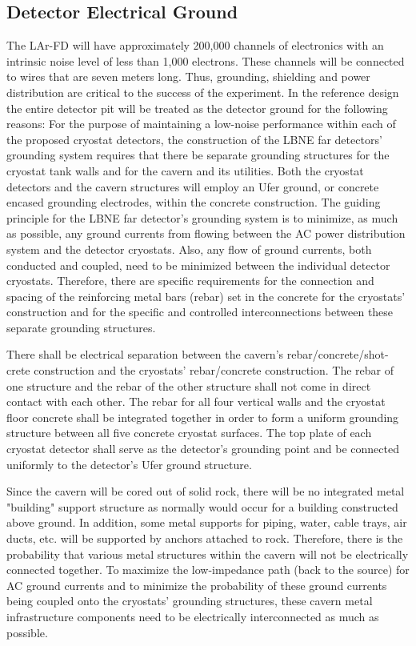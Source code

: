 \subsection{Detector Electrical Ground} 
\label{fd:install:integ:elecgnd}

The LAr-FD will have approximately 200,000 channels of electronics with an intrinsic noise level of less than 1,000 electrons. These channels will be connected to wires that are seven meters long. Thus, 
grounding, shielding and power distribution are critical to the success of the experiment. In the reference design the entire detector pit will be treated as the detector ground for the following reasons: 
For the purpose of maintaining a low-noise performance within each of the proposed cryostat detectors, the construction of the LBNE far detectors' grounding system requires that there be separate grounding 
structures for the cryostat tank walls and for the cavern and its utilities. Both the cryostat detectors and the cavern structures will employ an Ufer ground, or concrete encased grounding electrodes, within the concrete construction. The guiding principle for the LBNE far detector's grounding system is to minimize, 
as much as possible, any ground currents from flowing between the AC power distribution system and the detector cryostats. Also, any flow of ground currents, both conducted and coupled, need to be 
minimized between the individual detector cryostats. Therefore, there are specific requirements for the connection and spacing of the reinforcing metal bars (rebar) set in the concrete for the cryostats' 
construction and for the specific and controlled interconnections between these separate grounding structures.

There shall be electrical separation between the cavern's rebar/concrete/shot-crete construction and the cryostats' rebar/concrete construction. The rebar of one structure and the rebar of the other structure 
shall not come in direct contact with each other. The rebar for all four vertical walls and the cryostat floor concrete shall be integrated together in order to form a uniform grounding structure between all five 
concrete cryostat surfaces. The top plate of each cryostat detector shall serve as the detector's grounding point and be connected uniformly to the detector's Ufer ground structure.

Since the cavern will be cored out of solid rock, there will be no integrated metal "building" support structure as normally would occur for a building constructed above ground. In addition, some metal 
supports for piping, water, cable trays, air ducts, etc. will be supported by anchors attached to rock. Therefore, there is the probability that various metal structures within the cavern will not be electrically 
connected together. To maximize the low-impedance path (back to the source) for AC ground currents and to minimize the probability of these ground currents being coupled onto the cryostats' grounding 
structures, these cavern metal infrastructure components need to be electrically interconnected as much as possible. 

